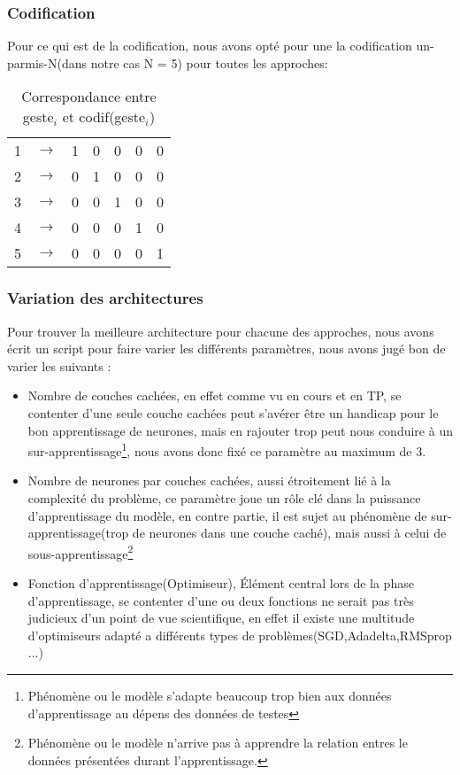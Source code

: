 \subsubsection{Codification}
Pour ce qui est de la codification, nous avons opté pour une la codification un-parmis-N(dans notre cas N = 5) pour toutes les approches:\\
\begin{table}[H]
	\centering
	\begin{tabular}{|c|l|c|c|c|c|c|}
		\cline{1-1} \cline{3-7}
		1 & $\rightarrow$ & 1 & 0 & 0 & 0 & 0 \\ \cline{1-1} \cline{3-7} 
		2 & $\rightarrow$ & 0 & 1 & 0 & 0 & 0 \\ \cline{1-1} \cline{3-7} 
		3 & $\rightarrow$ & 0 & 0 & 1 & 0 & 0 \\ \cline{1-1} \cline{3-7} 
		4 & $\rightarrow$ & 0 & 0 & 0 & 1 & 0 \\ \cline{1-1} \cline{3-7} 
		5 & $\rightarrow$ & 0 & 0 & 0 & 0 & 1 \\ \cline{1-1} \cline{3-7} 
	\end{tabular}
	\caption{Correspondance entre geste$_i$ et codif(geste$_i$)}
	
\end{table}


\subsubsection{Variation des architectures}
Pour trouver la meilleure architecture pour chacune des approches, nous avons écrit un script pour faire varier les différents paramètres, nous avons jugé bon de varier les suivants : 
\begin{itemize}
	\item Nombre de couches cachées, en effet comme vu en cours et en TP, se contenter d'une seule couche cachées peut s'avérer être un handicap pour le bon apprentissage de neurones, mais en rajouter trop peut nous conduire à un sur-apprentissage\footnote{Phénomène ou le modèle s'adapte beaucoup trop bien aux données d'apprentissage au dépens des données de testes}, nous avons donc fixé ce paramètre au maximum de 3.
	
	\item Nombre de neurones par couches cachées, aussi étroitement lié à la complexité du problème, ce paramètre joue un rôle clé dans la puissance d'apprentissage du modèle, en contre partie, il est sujet au phénomène de sur-apprentissage(trop de neurones dans une couche caché), mais aussi à celui de sous-apprentissage\footnote{Phénomène ou le modèle n'arrive pas à apprendre la relation entres le données présentées durant l'apprentissage.}
	
	\item Fonction d'apprentissage(Optimiseur), Élément central lors de la phase d'apprentissage, se contenter d'une ou deux fonctions ne serait pas très judicieux d'un point de vue scientifique, en effet il existe une multitude d'optimiseurs adapté a différents types de problèmes(SGD\cite{Bottou2010},Adadelta\cite{adapt},RMSprop\cite{rms} ...)
\end{itemize}


